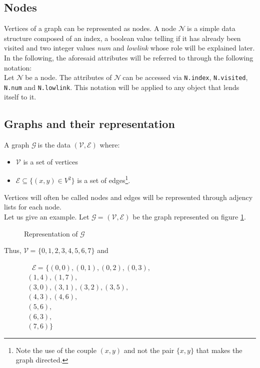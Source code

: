 \documentclass[a4 paper, 12pt]{article}
\def\NN{$\mathcal{N}~$}
\def\GG{$\mathcal{G}~$}
\def\VV{$\mathcal{V}~$}
\def\EE{$\mathcal{E}~$}
\begin{document}
\subsection{Nodes}

Vertices of a graph can be represented as nodes.
A node \NN is a simple data structure composed of an index, a boolean value telling if it has already been visited and two integer values \textit{num} and \textit{lowlink} whose role will be explained later.\\
In the following, the aforesaid attributes will be referred to through the following notation:\\
Let \NN be a node. The attributes of \NN can be accessed via \texttt{N.index}, \texttt{N.visited}, \texttt{N.num} and \texttt{N.lowlink}. This notation will be applied to any object that lends itself to it.

\subsection{Graphs and their representation}
A graph \GG is the data $(\mathcal{V}, \mathcal{E})$ where:
\begin{itemize}
    \item $\mathcal{V}$ is a set of vertices
    \item $\mathcal{E} \subseteq \{(x,y) \in V^2\}$ is a set of edges\footnote{Note the use of the couple $(x, y)$ and not the pair $\{x, y\}$ that makes the graph directed.}.
\end{itemize}
Vertices will often be called nodes and edges will be represented through adjency lists for each node.\\
Let us give an example. Let \GG = $(\mathcal{V}, \mathcal{E})$ be the graph represented on figure \ref{fig:graph}.
\begin{figure}[!h]
    \caption{Representation of \GG\label{fig:graph}}
\end{figure}
Thus, \VV = $\{0,1,2,3,4,5,6,7\}$ and
\begin{flushleft}
    ~~~~~~~~\EE = $\{(0,0),(0,1),(0,2),(0,3),$\\
    $~~~~~~~~~~~~~~~(1,4),(1,7),$\\
    $~~~~~~~~~~~~~~~(3,0),(3,1),(3,2),(3,5),$\\
    $~~~~~~~~~~~~~~~(4,3),(4,6),$\\
    $~~~~~~~~~~~~~~~(5,6),$\\
    $~~~~~~~~~~~~~~~(6,3),$\\
    $~~~~~~~~~~~~~~~(7,6)\}$
\end{flushleft}
\end{document}

